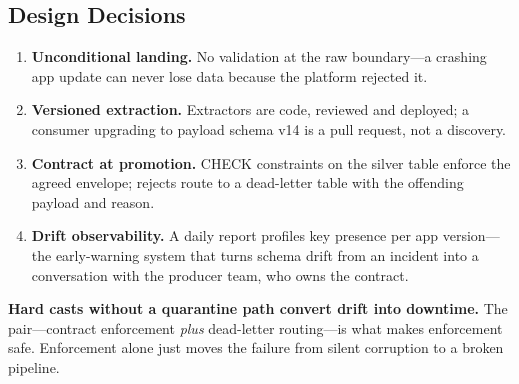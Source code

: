 \subsection{Design Decisions}
\begin{enumerate}
    \item \textbf{Unconditional landing.} No validation at the raw boundary---a crashing app update can never lose data because the platform rejected it.
    \item \textbf{Versioned extraction.} Extractors are code, reviewed and deployed; a consumer upgrading to payload schema v14 is a pull request, not a discovery.
    \item \textbf{Contract at promotion.} CHECK constraints on the silver table enforce the agreed envelope; rejects route to a dead-letter table with the offending payload and reason.
    \item \textbf{Drift observability.} A daily report profiles key presence per app version---the early-warning system that turns schema drift from an incident into a conversation with the producer team, who owns the contract.
\end{enumerate}

\begin{pitfall}
\textbf{Hard casts without a quarantine path convert drift into downtime.} The pair---contract enforcement \emph{plus} dead-letter routing---is what makes enforcement safe. Enforcement alone just moves the failure from silent corruption to a broken pipeline.
\end{pitfall}

